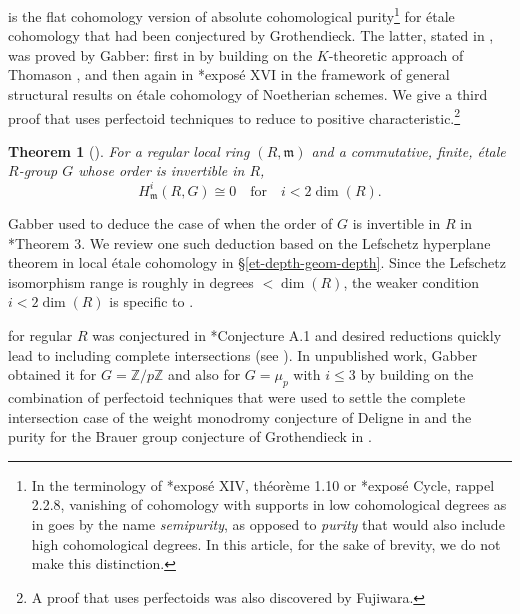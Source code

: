 \documentclass[11pt, reqno]{amsart}
\newcommand{\bZ}{\mathbb{Z}}
\newcommand{\fm}{\mathfrak{m}}
\DeclareMathOperator{\Char}{char}		%
\newcommand{\ce}{\colonequals}
\providecommand{\qxq}[1]{\quad\text{#1}\quad}
\newcommand{\bthm}{\begin{thm}}
\newcommand{\ethm}{\end{thm}}
\numberwithin{equation}{numberingbase}
\theoremstyle{thms}
\newtheorem{thm}[numberingbase]{Theorem}
\theoremstyle{claims}
\theoremstyle{defs}
\theoremstyle{thms}
\theoremstyle{defs}
\theoremstyle{subsection-tweak}
\theoremstyle{subsection-tweak}
\begin{document}
 is the flat cohomology version of absolute cohomological purity\footnote{\label{foot:semipurity}In the terminology of \cite{SGA2new}*{expos\'{e} XIV, th\'{e}or\`{e}me 1.10} or \cite{SGA4.5}*{expos\'{e} Cycle, rappel 2.2.8}, vanishing of cohomology with supports in low cohomological degrees as in  goes by the name \emph{semipurity}, as opposed to \emph{purity} that would also include high cohomological degrees. In this article, for the sake of brevity, we do not make this distinction.} for \'{e}tale cohomology that had been conjectured by Grothendieck. The latter, stated in , was proved by Gabber: first in \cite{Fuj02} by building on the $K$-theoretic approach of Thomason \cite{Tho84}, and then again in \cite{ILO14}*{expos\'{e} XVI} in the framework of general structural results on \'{e}tale cohomology of Noetherian schemes. We give a third proof that uses perfectoid techniques to reduce to positive characteristic.\footnote{A proof that uses perfectoids was also discovered by Fujiwara.}

\bthm[] \label{abs-coh-pur-ann}
For a regular local ring $(R, \fm)$ and a commutative, finite, \'{e}tale $R$-group $G$ whose order is invertible in $R$, 
\[
H^i_\fm(R, G) \cong 0 \qxq{for} i < 2\dim(R). 
\]
\ethm




Gabber used  to deduce the case of  when the order of $G$ is invertible in $R$ in \cite{Gab04}*{Theorem 3}. We review one such deduction based on the Lefschetz hyperplane theorem in local \'{e}tale cohomology in \S\ref{et-depth-geom-depth}. Since the Lefschetz isomorphism range is roughly in degrees $< \dim(R)$, the weaker condition $i < 2\dim(R)$ is specific to . %


 for regular $R$ was conjectured in \cite{Pop19}*{Conjecture A.1} and desired reductions quickly lead to including complete intersections (see ).
In unpublished work, Gabber obtained it %
for $G = \bZ/p\bZ$ and  also for $G = \mu_p$ with $i \le 3$ by building on the combination of perfectoid techniques that were used to settle the complete intersection case of the weight monodromy conjecture of Deligne in \cite{Sch12} and the purity for the Brauer group conjecture of Grothendieck in \cite{brauer-purity}.
\end{document}
